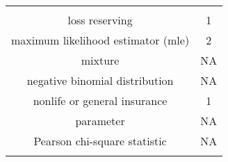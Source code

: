 \documentclass[]{book}
\theoremstyle{definition}
\theoremstyle{definition}
\theoremstyle{definition}
\theoremstyle{remark}
\begin{document}
\begin{longtable}[]{@{}cc@{}}
\begin{minipage}[t]{0.30\columnwidth}
\end{minipage}\tabularnewline
\begin{minipage}[t]{0.43\columnwidth}\centering\strut
loss reserving\strut
\end{minipage} & \begin{minipage}[t]{0.30\columnwidth}\centering\strut
1\strut
\end{minipage}\tabularnewline
\begin{minipage}[t]{0.43\columnwidth}\centering\strut
maximum likelihood estimator (mle)\strut
\end{minipage} & \begin{minipage}[t]{0.30\columnwidth}\centering\strut
2\strut
\end{minipage}\tabularnewline
\begin{minipage}[t]{0.43\columnwidth}\centering\strut
mixture\strut
\end{minipage} & \begin{minipage}[t]{0.30\columnwidth}\centering\strut
NA\strut
\end{minipage}\tabularnewline
\begin{minipage}[t]{0.43\columnwidth}\centering\strut
negative binomial distribution\strut
\end{minipage} & \begin{minipage}[t]{0.30\columnwidth}\centering\strut
NA\strut
\end{minipage}\tabularnewline
\begin{minipage}[t]{0.43\columnwidth}\centering\strut
nonlife or general insurance\strut
\end{minipage} & \begin{minipage}[t]{0.30\columnwidth}\centering\strut
1\strut
\end{minipage}\tabularnewline
\begin{minipage}[t]{0.43\columnwidth}\centering\strut
parameter\strut
\end{minipage} & \begin{minipage}[t]{0.30\columnwidth}\centering\strut
NA\strut
\end{minipage}\tabularnewline
\begin{minipage}[t]{0.43\columnwidth}\centering\strut
Pearson chi-square statistic\strut
\end{minipage} & \begin{minipage}[t]{0.30\columnwidth}\centering\strut
NA\strut
\end{minipage}\tabularnewline
\begin{minipage}[t]{0.43\columnwidth}\centering\strut

\end{minipage}
\end{longtable}
\end{document}
